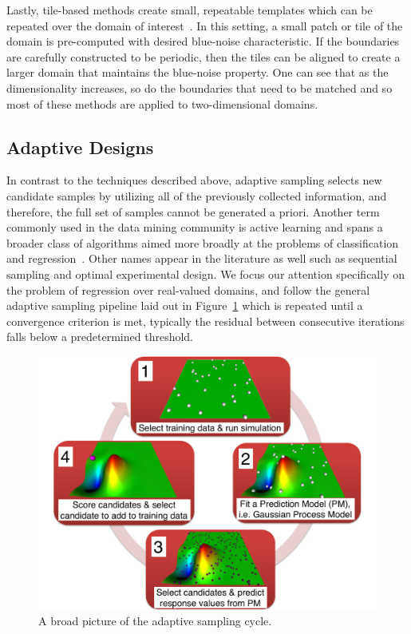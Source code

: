 Lastly, tile-based methods create small, repeatable templates which can be repeated over the domain of interest~\cite{HillerDeussenKeller2001,KopfCohenOrDeussen2006,LagaeDutre2005,Ostromoukhov2007,OstromoukhovDonohueJodoin2004,WachtelPilleboueCoeurjolly2014}.
%
In this setting, a small patch or tile of the domain is pre-computed with desired blue-noise characteristic.
%
If the boundaries are carefully constructed to be periodic, then the tiles can be aligned to create a larger domain that maintains the blue-noise property.
%
One can see that as the dimensionality increases, so do the boundaries that need to be matched and so most of these methods are applied to two-dimensional domains.

\subsection{Adaptive Designs}
\label{sec:adaptiveSampling}

In contrast to the techniques described above, adaptive sampling selects new candidate samples by utilizing all of the previously collected information, and therefore, the full set of samples cannot be generated a priori.
%
Another term commonly used in the data mining community is active learning and spans a broader class of algorithms aimed more broadly at the problems of classification and regression~\cite{Settles2009}.
%
Other names appear in the literature as well such as sequential sampling and optimal experimental design.
%
We focus our attention specifically on the problem of regression over real-valued domains, and follow the general adaptive sampling pipeline laid out in Figure~\ref{fig:asCycle} which is repeated until a convergence criterion is met, typically the residual between consecutive iterations falls below a predetermined threshold.

\begin{figure}[t]
  \centering
  \includegraphics[width=.75\textwidth]{figs/chap3/pipeline}
  \caption[Adaptive Sampling Cycle]{A broad picture of the adaptive sampling
  cycle.}
  \label{fig:asCycle}
\end{figure}

